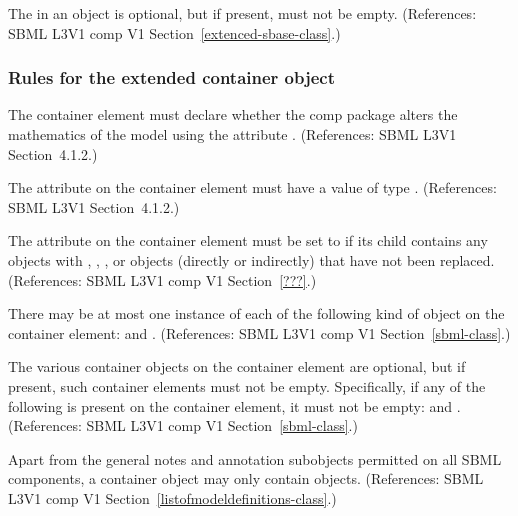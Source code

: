 \begin{sbmlenum}
 { The \ListOfReplacedElements in an \SBase object is
  optional, but if present, must not be empty.
  (References: SBML L3V1 comp V1 Section~\ref{extenced-sbase-class}.) }


\end{sbmlenum} \subsubsection*{Rules for the extended  container object} \begin{sbmlenum}

 { The  container element must declare whether 
  the comp package alters the mathematics of the model using the attribute
  .  
  (References: SBML L3V1 Section~4.1.2.) }
  

 { The attribute  on the  
  container element must have a value of type .  
  (References: SBML L3V1 Section~4.1.2.) }
  

 { The attribute  on the  
  container element must be set to  if its
  \Model child contains any \Submodel objects with \Species, \Parameter,
  \Reaction, or \Event objects (directly or indirectly) that have not been
  replaced. 
  (References: SBML L3V1 comp V1 Section~\ref{???}.) }


 { There may be at most one instance of each of the
  following kind of object on the  container element:  
  \ListOfModelDefinitions and \ListOfExternalModelDefinitions. 
  (References: SBML L3V1 comp V1 Section~\ref{sbml-class}.) }


 { The various  container objects on 
  the  container element are optional, but if present, such 
  container elements must not be empty. Specifically, if any of the following 
  is present on the  container element, it must not be empty: 
  \ListOfModelDefinitions and \ListOfExternalModelDefinitions.
  (References: SBML L3V1 comp V1 Section~\ref{sbml-class}.) }
  

 { Apart from the general notes and annotation
  subobjects permitted on all SBML components, a \ListOfModelDefinitions
  container object may only contain \ModelDefinition objects.
  (References: SBML L3V1 comp V1 Section~\ref{listofmodeldefinitions-class}.) }



\end{sbmlenum}

